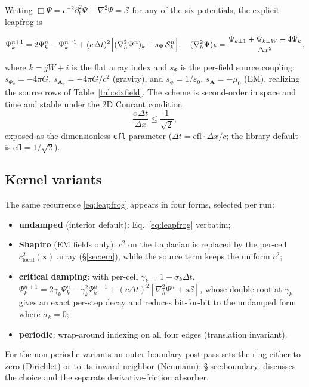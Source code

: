 \documentclass[11pt]{article}
\newcommand{\Phig}{\Phi_g}                 %
\newcommand{\Ag}{\mathbf{A}_g}             %
\newcommand{\vv}[1]{\mathbf{#1}}           %
\newcommand{\dx}{\Delta x}                 %
\newcommand{\dt}{\Delta t}                 %
\newcommand{\clocal}{c_{\mathrm{local}}}
\begin{document}
Writing $\Box\Psi = c^{-2}\partial_t^2\Psi-\nabla^2\Psi = \mathcal S$ for any of
the six potentials, the explicit leapfrog is
\begin{eqbox}
\begin{equation}
\label{eq:leapfrog}
  \Psi^{n+1}_{k} = 2\Psi^n_k - \Psi^{n-1}_k
     + (c\,\dt)^2\Bigl[(\nabla_h^2\Psi^n)_k + s_\Psi\,\mathcal{S}^n_k\Bigr],
  \quad
  (\nabla_h^2\Psi)_k = \frac{\Psi_{k\pm1}+\Psi_{k\pm W}-4\Psi_k}{\dx^2},
\end{equation}
\end{eqbox}
where $k=jW+i$ is the flat array index and $s_\Psi$ is the per-field source
coupling: $s_{\Phig}=-4\pi G$, $s_{\Ag}=-4\pi G/c^2$ (gravity), and
$s_{\phi}=1/\varepsilon_0$, $s_{\vv{A}}=-\mu_0$ (EM), realizing the source rows
of Table~\ref{tab:sixfield}. The scheme is second-order in space and time and
stable under the 2D Courant condition
\begin{equation}
\label{eq:cfl}
  \frac{c\,\dt}{\dx}\le \frac{1}{\sqrt2},
\end{equation}
exposed as the dimensionless \texttt{cfl} parameter ($\dt = \mathrm{cfl}\cdot
\dx/c$; the library default is $\mathrm{cfl}=1/\sqrt2$).

\subsection{Kernel variants}

The same recurrence \eqref{eq:leapfrog} appears in four forms, selected per run:
\begin{itemize}\setlength\itemsep{2pt}
  \item \textbf{undamped} (interior default): Eq.~\eqref{eq:leapfrog} verbatim;
  \item \textbf{Shapiro} (EM fields only): $c^2$ on the Laplacian is replaced by
  the per-cell $\clocal^2(\vv{x})$ array (\S\ref{sec:em}), while the source term
  keeps the uniform $c^2$;
  \item \textbf{critical damping}: with per-cell $\gamma_k=1-\sigma_k\dt$,
  $\Psi^{n+1}_k = 2\gamma_k\Psi^n_k-\gamma_k^2\Psi^{n-1}_k+(c\dt)^2[\nabla_h^2\Psi^n+s\mathcal S]$,
  whose double root at $\gamma_k$ gives an exact per-step decay and reduces
  bit-for-bit to the undamped form where $\sigma_k=0$;
  \item \textbf{periodic}: wrap-around indexing on all four edges (translation
  invariant).
\end{itemize}
For the non-periodic variants an outer-boundary post-pass sets the ring either to
zero (Dirichlet) or to its inward neighbor (Neumann); \S\ref{sec:boundary}
discusses the choice and the separate derivative-friction absorber.
\end{document}
